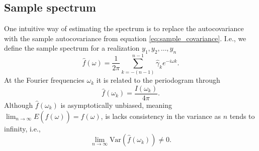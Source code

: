 \documentclass[a4paper, 10pt]{memoir}
\theoremstyle{plain}
\theoremstyle{definition}
\theoremstyle{remark}
\begin{document}
\subsection{Sample spectrum}
One intuitive way of estimating the spectrum is to replace the autocovariance with the sample autocovariance from equation \eqref{eq:sample_covariance}.
I.e., we define the sample spectrum for a realization $y_1, y_2,  \hdots, y_n$
\begin{equation}\label{eq:sample_spectrum}
        \hat{f}(\omega) = \frac{1}{2\pi}\sum_{k = -(n - 1)}^{n-1}\hat{\gamma}_k e^{-i\omega k}.
\end{equation}
At the Fourier frequencies $\omega_k$ it is related to the periodogram through \cite{wei}
\begin{equation*}
        \hat{f}(\omega_k) = \frac{I(\omega_k)}{4 \pi}.
\end{equation*}
Although $\hat{f}(\omega_k)$ is asymptotically unbiased, meaning $\lim_{n \rightarrow \infty} E(\hat{f}(\omega)) = f(\omega)$, is lacks consistency in the variance as $n$ tends to infinity, i.e.,
\begin{equation*}
        \lim_{n \rightarrow \infty} \text{Var}(\hat{f}(\omega_k)) \neq 0.
\end{equation*}
\end{document}
